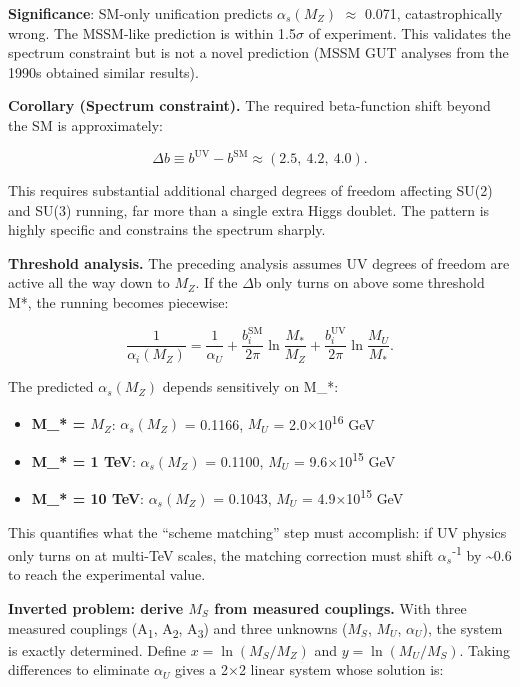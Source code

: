 \documentclass[11pt,a4paper]{article}
\theoremstyle{remark}
\providecommand{\tightlist}{%
  \setlength{\itemsep}{0pt}\setlength{\parskip}{0pt}}
\begin{document}
\textbf{Significance}: SM-only unification predicts \(\ensuremath{\alpha}_s(M_Z)\) \ensuremath{\approx} 0.071,
catastrophically wrong. The MSSM-like prediction is within 1.5\ensuremath{\sigma} of
experiment. This validates the spectrum constraint but is not a novel
prediction (MSSM GUT analyses from the 1990s obtained similar results).

\textbf{Corollary (Spectrum constraint).} The required beta-function shift beyond
the SM is approximately:

\[
\Delta b \equiv b^{\mathrm{UV}} - b^{\mathrm{SM}} \approx (2.5,\ 4.2,\ 4.0).
\]

This requires substantial additional charged degrees of freedom affecting
SU(2) and SU(3) running, far more than a single extra Higgs doublet.
The pattern is highly specific and constrains the spectrum sharply.

\textbf{Threshold analysis.} The preceding analysis assumes UV degrees of freedom
are active all the way down to \(M_Z\). If the \ensuremath{\Delta}b only turns on above
some threshold M*, the running becomes piecewise:

\[
\frac{1}{\alpha_i(M_Z)} = \frac{1}{\alpha_U} + \frac{b_i^\mathrm{SM}}{2\pi}
\ln\frac{M_\ast}{M_Z} + \frac{b_i^\mathrm{UV}}{2\pi}\ln\frac{M_U}{M_\ast}.
\]

The predicted \(\ensuremath{\alpha}_s(M_Z)\) depends sensitively on M\_*:

\begin{itemize}
\tightlist
\item
  \textbf{M\_* = \(M_Z\)}: \(\ensuremath{\alpha}_s(M_Z)\) = 0.1166, \(M_U\) = 2.0\ensuremath{\times}10\textsuperscript{16} GeV
\item
  \textbf{M\_* = 1 TeV}: \(\ensuremath{\alpha}_s(M_Z)\) = 0.1100, \(M_U\) = 9.6\ensuremath{\times}10\textsuperscript{15} GeV
\item
  \textbf{M\_* = 10 TeV}: \(\ensuremath{\alpha}_s(M_Z)\) = 0.1043, \(M_U\) = 4.9\ensuremath{\times}10\textsuperscript{15} GeV
\end{itemize}

This quantifies what the ``scheme matching'' step must accomplish: if UV physics
only turns on at multi-TeV scales, the matching correction must shift
\(\ensuremath{\alpha}_s\)\textsuperscript{-1} by \textasciitilde0.6 to reach the experimental value.

\textbf{Inverted problem: derive \(M_S\) from measured couplings.} With three measured
couplings (A\textsubscript{1}, A\textsubscript{2}, A\textsubscript{3}) and three unknowns (\(M_S\), \(M_U\), \(\ensuremath{\alpha}_U\)), the
system is exactly determined. Define \(x = \ln(M_S/M_Z)\) and
\(y = \ln(M_U/M_S)\). Taking differences to eliminate \(\ensuremath{\alpha}_U\) gives a 2\ensuremath{\times}2
linear system whose solution is:
\end{document}
